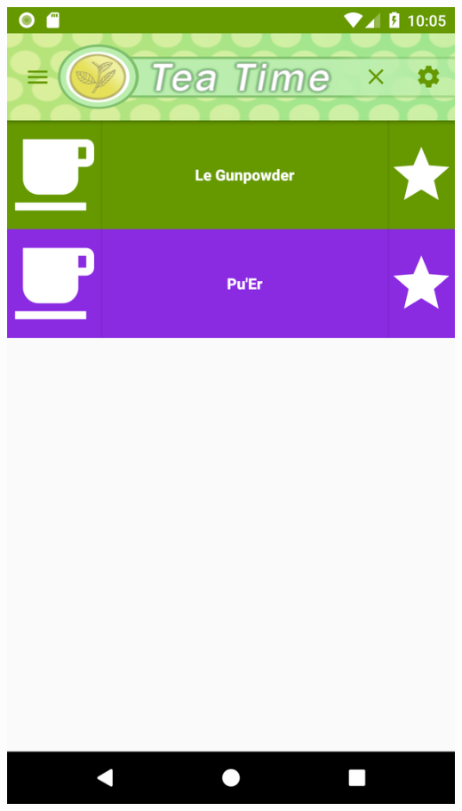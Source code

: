 \documentclass[a4paper,12pt]{article}
\begin{document}
\begin{spacing}{1}
	\includegraphics*[scale=0.1]{Screenshot/11.png}    

\end{spacing}
\end{document}
